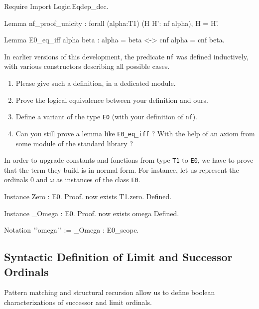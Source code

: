 

\begin{Coqsrc}
Require Import Logic.Eqdep_dec.

Lemma nf_proof_unicity :
  forall (alpha:T1) (H H': nf alpha), H = H'.

Lemma E0_eq_iff alpha beta : alpha = beta <-> cnf alpha = cnf beta.
\end{Coqsrc}

\begin{exercise}
In earlier versions of this development, the predicate \texttt{nf} was defined  inductively, with various constructors describing all possible cases.
\begin{enumerate}
\item Please give such a definition, in a dedicated module.
\item Prove the logical equivalence between your definition and ours.
\item Define a variant of the type \texttt{E0} (with your definition of \texttt{nf}).
\item Can you still prove a lemma like \texttt{E0\_eq\_iff} ? With the help of an axiom from some module of the standard library ?
\end{enumerate}
\end{exercise}


In order to  upgrade constants and fonctions from type \texttt{T1} to \texttt{E0}, we have to prove that 
the term they build is in normal form.
For instance, let us represent the ordinals $0$ and $\omega$ as instances of the class \texttt{E0}.

\label{sect:omega-T1}

\begin{Coqsrc}
Instance Zero : E0.
Proof.
  now exists T1.zero.
Defined.

Instance _Omega : E0.
Proof.  now exists omega%
Defined.

Notation "'omega'"  := _Omega : E0_scope.
\end{Coqsrc}



\subsection{Syntactic Definition of Limit and Successor Ordinals}

Pattern matching and structural recursion allow us to define boolean characterizations  of successor and limit ordinals.


